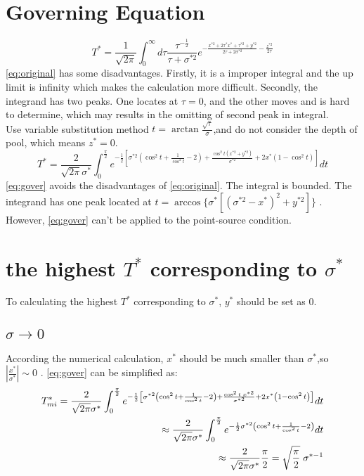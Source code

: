 \documentclass[review, 1p, number, sort&compress,table]{elsarticle}
\begin{document}
	\section{Governing Equation}\label{sec:governing}
		\begin{equation}  \label{eq:original}
		T^*=\frac{1}{\sqrt{2\pi}}\int_{0}^{\infty}{d\tau}\frac{\tau^{-\frac{1}{2}}}{\tau+\sigma^{*2}}e^{-\frac{x^{*2}+2\tau^*x^{*}+\tau^{*2}+y^{*2}}{2\tau+2\sigma^{*2}}-\frac{z^{*2}}{2\tau}}
		\end{equation}
		\autoref{eq:original} has some disadvantages. Firstly, it is a improper integral and the up limit is infinity which makes the calculation more difficult. Secondly, the integrand has two peaks. One locates at $\tau=0$, and the other moves and is hard to determine, which may results in the omitting of second peak in integral.  \\
		Use variable substitution method $t=\arctan{\frac{\sqrt{\tau}}{\sigma}}$,and do not consider the depth of  pool, which means $z^*=0$.
		\begin{equation} \label{eq:gover}
		T^{*}=\frac{2}{\sqrt{2\pi}\sigma^*}\int_{0}^{\frac{\pi}{2}} e^{-\frac{1}{2}\left[\sigma^{*2}\left(\cos^2{t}+\frac{1}{\cos^2{t}}-2 \right)+\frac{\cos^2{t}\left(x^{*2}+y^{*2}\right) }{\sigma^{*2}}+2x^{*}\left( 1-\cos^2{t} \right)          \right] }dt
		\end{equation}
		\autoref{eq:gover} avoids the disadvantages of \autoref{eq:original}. The integral  is bounded. The integrand has one peak located  at $t=\arccos{\{\sigma^{*}[(\sigma^{*2}-x^{*})^2+y^{*2}]}\}$ . However, \autoref{eq:gover} can't be applied to the point-source condition.   \\ 
		
	\section{the highest $T^{*}$ corresponding to $\sigma^{*}$}\label{sec:2}	
	To calculating the highest $T^{*}$ corresponding to $\sigma^{*}$, $y^{*}$ should be set as $0$.\\
	\subsection{$\sigma\rightarrow{0}$}
	According the numerical calculation, $x^{*}$ should be much smaller than $\sigma^{*}$,so $|\frac{x^{*}}{\sigma^{*}}|\sim 0$ . \autoref{eq:gover} can be simplified as:	
		\begin{eqnarray} \label{eq:TvS.0}
				\nonumber 
				T^{*}_{m\uppercase\expandafter{\romannumeral1}} =\frac{2}{\sqrt{2\pi}\sigma^*}\int_{0}^{\frac{\pi}{2}} e^{-\frac{1}{2}\left[\sigma^{*2}\left(\cos^2{t}+\frac{1}{\cos^2{t}}-2 \right)+\frac{\cos^2{t} \; x^{*2}}{\sigma^{*2}}+2x^{*}\left( 1-\cos^2{t} \right)\right] }dt
				\\  \nonumber 
				\approx\frac{2}{\sqrt{2\pi}\sigma^*}\int_{0}^{\frac{\pi}{2}} e^{-\frac{1}{2}\sigma^{*2}\left(\cos^2{t}+\frac{1}{\cos^2{t}}-2 \right) }dt
				\\ 
				\approx \frac{2}{\sqrt{2\pi}\sigma^*}\frac{\pi}{2} = \sqrt{\frac{\pi}{2}}    \; \sigma^{*-1} 
		\end{eqnarray}
\end{document}
